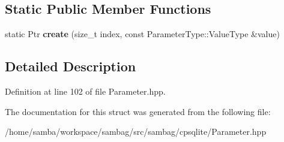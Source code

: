 \subsection*{Static Public Member Functions}
\begin{DoxyCompactItemize}
\item 
\hypertarget{structsambag_1_1cpsqlite_1_1_value_parameter_a850b6db5f904ab89ed3aa5ec9b95edf7}{
static Ptr {\bfseries create} (size\_\-t index, const ParameterType::ValueType \&value)}
\label{structsambag_1_1cpsqlite_1_1_value_parameter_a850b6db5f904ab89ed3aa5ec9b95edf7}

\end{DoxyCompactItemize}


\subsection{Detailed Description}


Definition at line 102 of file Parameter.hpp.



The documentation for this struct was generated from the following file:\begin{DoxyCompactItemize}
\item 
/home/samba/workspace/sambag/src/sambag/cpsqlite/Parameter.hpp\end{DoxyCompactItemize}
